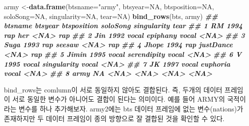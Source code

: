 \documentclass[
]{book}
\newenvironment{Shaded}{\begin{snugshade}}{\end{snugshade}}
\newcommand{\AttributeTok}[1]{\textcolor[rgb]{0.13,0.29,0.53}{#1}}
\newcommand{\ConstantTok}[1]{\textcolor[rgb]{0.56,0.35,0.01}{#1}}
\newcommand{\DocumentationTok}[1]{\textcolor[rgb]{0.56,0.35,0.01}{\textbf{\textit{#1}}}}
\newcommand{\FunctionTok}[1]{\textcolor[rgb]{0.13,0.29,0.53}{\textbf{#1}}}
\newcommand{\NormalTok}[1]{#1}
\newcommand{\OtherTok}[1]{\textcolor[rgb]{0.56,0.35,0.01}{#1}}
\newcommand{\StringTok}[1]{\textcolor[rgb]{0.31,0.60,0.02}{#1}}
\begin{document}
\begin{Shaded}
\begin{Highlighting}[]
\NormalTok{army }\OtherTok{\textless{}{-}}\FunctionTok{data.frame}\NormalTok{(}\AttributeTok{btsname=}\StringTok{"army"}\NormalTok{, }\AttributeTok{btsyear=}\ConstantTok{NA}\NormalTok{, }\AttributeTok{btsposition=}\ConstantTok{NA}\NormalTok{, }\AttributeTok{soloSong=}\ConstantTok{NA}\NormalTok{, }\AttributeTok{singularity=}\ConstantTok{NA}\NormalTok{, }\AttributeTok{tear=}\ConstantTok{NA}\NormalTok{)}
\FunctionTok{bind\_rows}\NormalTok{(bts, army)}
\DocumentationTok{\#\#   btsname btsyear btsposition    soloSong singularity tear}
\DocumentationTok{\#\# 1      RM    1994         rap         her        \textless{}NA\textgreater{}  rap}
\DocumentationTok{\#\# 2     Jin    1992       vocal    epiphany       vocal \textless{}NA\textgreater{}}
\DocumentationTok{\#\# 3    Suga    1993         rap      seesaw        \textless{}NA\textgreater{}  rap}
\DocumentationTok{\#\# 4   Jhope    1994         rap   justDance        \textless{}NA\textgreater{}  rap}
\DocumentationTok{\#\# 5   Jimin    1995       vocal serendipity       vocal \textless{}NA\textgreater{}}
\DocumentationTok{\#\# 6       V    1995       vocal singularity       vocal \textless{}NA\textgreater{}}
\DocumentationTok{\#\# 7      JK    1997       vocal    euphoria       vocal \textless{}NA\textgreater{}}
\DocumentationTok{\#\# 8    army      NA        \textless{}NA\textgreater{}        \textless{}NA\textgreater{}        \textless{}NA\textgreater{} \textless{}NA\textgreater{}}
\end{Highlighting}
\end{Shaded}

bind\_rows는 comlumn이 서로 동일하지 않아도 결합된다. 즉, 두개의 데이터 프레임이 서로 동일한 변수가 아니어도 결합이 된다는 의미이다. 예를 들어 ARMY의 국적이라는 변수를 하나 추가해보자. army2에는 bts 데이터 프레임에 없는 변수(nations)가 존재하지만 두 데이터 프레임이 종의 방향으로 잘 결합된 것을 확인할 수 있다.
\end{document}
